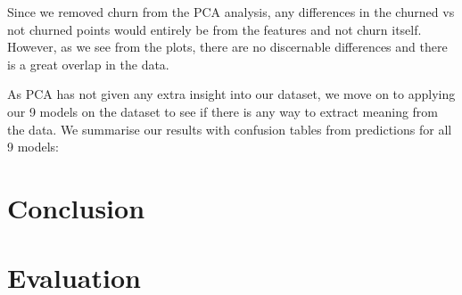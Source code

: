 \documentclass[]{article}
\begin{document}
Since we removed churn from the PCA analysis, any differences in the churned vs not churned points would entirely be from the features and not churn itself. However, as we see from the plots, there are no discernable differences and there is a great overlap in the data. 

As PCA has not given any extra insight into our dataset, we move on to applying our 9 models on the dataset to see if there is any way to extract meaning from the data. We summarise our results with confusion tables from predictions for all 9 models:

\section{Conclusion}

\section{Evaluation}
\end{document}
